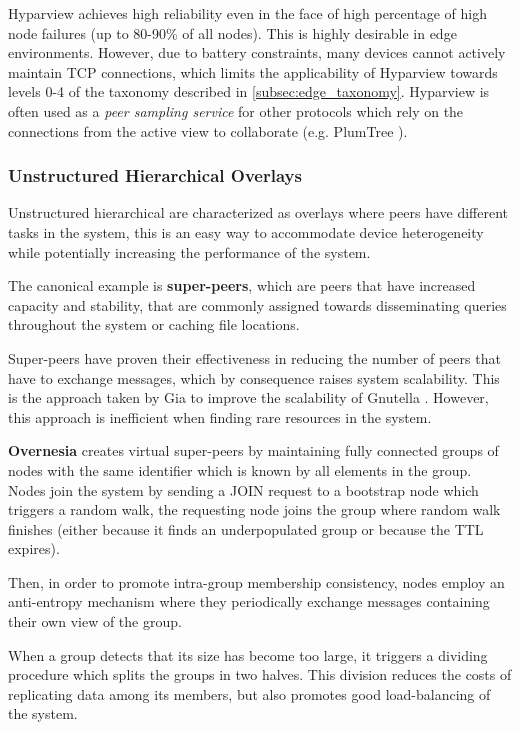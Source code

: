 Hyparview achieves high reliability even in the face of high percentage of high node failures (up to 80-90\% of all nodes). This is highly desirable in edge environments. However, due to battery constraints, many devices cannot actively maintain TCP connections, which limits the applicability of Hyparview towards levels 0-4 of the taxonomy described in \ref{subsec:edge_taxonomy}. Hyparview is often used as a \textit{peer sampling service} for other protocols which rely on the connections from the active view to collaborate (e.g. PlumTree \cite{leitao2007epidemic}).

\subsubsection{Unstructured Hierarchical Overlays}

Unstructured hierarchical are characterized as overlays where peers have different tasks in the system, this is an easy way to accommodate device heterogeneity while potentially increasing the performance of the system. 

The canonical example is \textbf{super-peers}, which are peers that have increased capacity and stability, that are commonly assigned towards disseminating queries throughout the system or caching file locations.

Super-peers have proven their effectiveness in reducing the number of peers that have to exchange messages, which by consequence raises system scalability. This is the approach taken by Gia \cite{Chawathe2003} to improve the scalability of Gnutella \cite{gnutella_gtk}. However, this approach is inefficient when finding rare resources in the system.

\textbf{Overnesia} \cite{leitao2014overnesia} creates virtual super-peers by maintaining fully connected groups of nodes with the same identifier which is known by all elements in the group. Nodes join the system by sending a JOIN request to a bootstrap node which triggers a random walk, the requesting node joins the group where random walk finishes (either because it finds an underpopulated group or because the TTL expires). 

Then, in order to promote intra-group membership consistency, nodes employ an anti-entropy mechanism where they periodically exchange messages containing their own view of the group. 

When a group detects that its size has become too large, it triggers a dividing procedure which splits the groups in two halves. This division reduces the costs of replicating data among its members, but also promotes good load-balancing of the system. 

